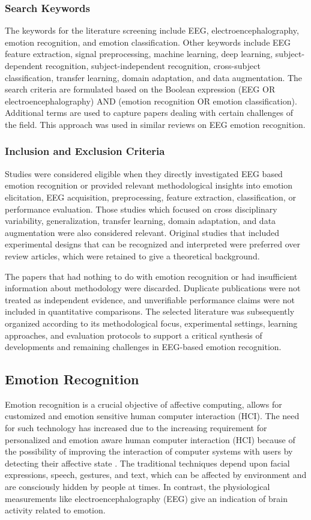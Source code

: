 \documentclass[ASNA,twocolumn]{USG}
\begin{document}
\subsubsection{Search Keywords}
The keywords for the literature screening include EEG, electroencephalography, emotion recognition, and emotion classification. Other keywords include EEG feature extraction, signal preprocessing, machine learning, deep learning, subject-dependent recognition, subject-independent recognition, cross-subject classification, transfer learning, domain adaptation, and data augmentation. The search criteria are formulated based on the Boolean expression (EEG OR electroencephalography) AND (emotion recognition OR emotion classification). Additional terms are used to capture papers dealing with certain challenges of the field. This approach was used in similar reviews on EEG emotion recognition.

\subsubsection{Inclusion and Exclusion Criteria}

Studies were considered eligible when they directly investigated EEG based emotion recognition or provided relevant methodological insights into emotion elicitation, EEG acquisition, preprocessing, feature extraction, classification, or performance evaluation. Those studies which focused on cross disciplinary variability, generalization, transfer learning, domain adaptation, and data augmentation were also considered relevant. Original studies that included experimental designs that can be recognized and interpreted were preferred over review articles, which were retained to give a theoretical background.

The papers that had nothing to do with emotion recognition or had insufficient information about methodology were discarded. Duplicate publications were not treated as independent evidence, and unverifiable performance claims were not included in quantitative comparisons. The selected literature was subsequently organized according to its methodological focus, experimental settings, learning approaches, and evaluation protocols to support a critical synthesis of developments and remaining challenges in EEG-based emotion recognition.

\subsection{Emotion Recognition}
Emotion recognition is a crucial objective of affective computing, allows for customized and emotion sensitive human computer interaction (HCI). The need for such technology has increased due to the increasing requirement for personalized and emotion aware human computer interaction (HCI) because of the possibility of improving the interaction of computer systems with users by detecting their affective state \cite{moin2023emotion}. The traditional techniques depend upon facial expressions, speech, gestures, and text, which can be affected by environment and are consciously hidden by people at times. In contrast, the physiological measurements like electroencephalography (EEG) give an indication of brain activity related to emotion.
\end{document}

